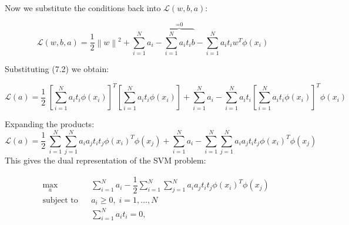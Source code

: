 \documentclass[twoside]{article}
\newcommand{\norm}[1]{\left\lVert #1 \right\rVert}
\begin{document}
Now we substitute the conditions back into $\mathcal{L}(w,b,a)$:

\begin{equation*}
    \mathcal{L}(w,b,a) = \dfrac{1}{2} \norm{w}^2 + \sum_{i=1}^{N} a_{i} 
    - \overbrace{\sum_{i=1}^{N} a_{i}t_{i}b}^\text{=0} - \sum_{i=1}^{N} a_{i}t_{i} w^T \phi(x_{i})
\end{equation*}

Substituting (7.2) we obtain:

\begin{equation*}
    \mathcal{L}(a) = \dfrac{1}{2} \  [\sum_{i=1}^{N} a_{i}t_{i}\phi(x_{i})]^T [\sum_{i=1}^{N} a_{i}t_{i}\phi(x_{i})] + \sum_{i=1}^{N} a_{i} - \sum_{i=1}^{N} a_{i} t_{i} [\sum_{i=1}^{N} a_{i}t_{i}\phi(x_{i})]^T \phi(x_{i})
    \end{equation*}
    
Expanding the products:
\begin{equation*}
    \mathcal{L}(a) = \dfrac{1}{2} \  \sum_{i=1}^{N} { \sum_{j=1}^{N} a_{i} a_{j} t_{i} t_{j} \phi(x_{i})^T \phi(x_{j})}
    + \sum_{i=1}^{N} a_{i}  -
    \sum_{i=1}^{N} { \sum_{j=1}^{N} a_{i} a_{j} t_{i} t_{j} \phi(x_{i})^T \phi(x_{j})}
    \end{equation*}
\newpage
This gives the dual representation of the SVM problem:

\begin{equation*}
\begin{aligned}
& \underset{a}{\text{max}}
& & \sum_{i=1}^{N} a_{i}  - \dfrac{1}{2}
    \sum_{i=1}^{N} { \sum_{j=1}^{N} a_{i} a_{j} t_{i} t_{j} \phi(x_{i})^T \phi(x_{j})}\\
& \text{subject to}
& & a_{i}  \geq 0, \; i = 1, \ldots, N \\
&&& \sum_{i=1}^{N} a_{i}t_{i} = 0, 
\end{aligned}
\end{equation*}
\end{document}
